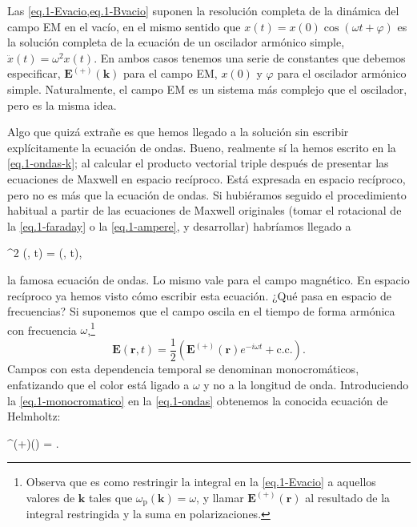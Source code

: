 Las \cref{eq.1-Evacio,eq.1-Bvacio} suponen la resolución completa de la dinámica del campo EM en el vacío, en el mismo sentido que \(x(t) = x(0)\cos(\omega t + \varphi)\) es la solución completa de la ecuación de un oscilador armónico simple, \(\ddot{x}(t) = \omega^2x(t)\). En ambos casos tenemos una serie de constantes que debemos especificar, \(\mathbf{E}^{(+)}(\mathbf{k})\) para el campo EM, \(x(0)\) y \(\varphi\) para el oscilador armónico simple. Naturalmente, el campo EM es un sistema más complejo que el oscilador, pero es la misma idea. 

Algo que quizá extrañe es que hemos llegado a la solución sin escribir explícitamente la ecuación de ondas. Bueno, realmente sí la hemos escrito en la \cref{eq.1-ondas-k}; al calcular el producto vectorial triple después de presentar las ecuaciones de Maxwell en espacio recíproco. Está expresada en espacio recíproco, pero no es más que la ecuación de ondas. Si hubiéramos seguido el procedimiento habitual a partir de las ecuaciones de Maxwell originales (tomar el rotacional de la \cref{eq.1-faraday} o la \cref{eq.1-ampere}, y desarrollar) habríamos llegado a
\begin{bequation}
    \label{eq.1-ondas}
    \nabla^2 (, t) =  (, t),
\end{bequation}
la famosa ecuación de ondas. Lo mismo vale para el campo magnético. En espacio recíproco ya hemos visto cómo escribir esta ecuación. ¿Qué pasa en espacio de frecuencias? Si suponemos que el campo oscila en el tiempo de forma armónica con frecuencia \(\omega\),\footnote{Observa que es como restringir la integral en la \cref{eq.1-Evacio} a aquellos valores de \(\mathbf{k}\) tales que \(\omega_\mathrm{p}(\mathbf{k})=\omega\), y llamar \(\mathbf{E}^{(+)}(\mathbf{r})\) al resultado de la integral restringida y la suma en polarizaciones.}
\begin{equation}
    \label{eq.1-monocromatico}
    \mathbf{E}(\mathbf{r}, t) = \frac{1}{2}\left(\mathbf{E}^{(+)}(\mathbf{r}) e^{{-i\omega t}} + \mathrm{c.c.}\right).
\end{equation}
Campos con esta dependencia temporal se denominan monocromáticos, enfatizando que el color está ligado a \(\omega\) y no a la longitud de onda. Introduciendo la \cref{eq.1-monocromatico} en la \cref{eq.1-ondas} obtenemos la conocida ecuación de Helmholtz:
\begin{bequation}
    \label{eq.1-helmholtz}
    ^{(+)}() = .
\end{bequation}

